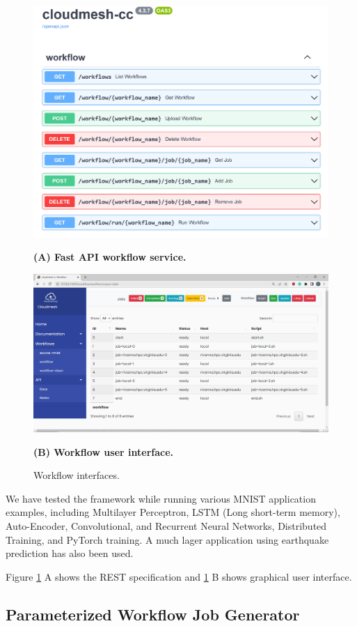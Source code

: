 \documentclass[utf8]{FrontiersinVancouver} %
\begin{document}
{\begin{figure}[htb]
  \centering\includegraphics[width=0.8\columnwidth]{images/fastapi-service-highres.png}
  
  {\bf (A) Fast API workflow service.}

  \bigskip


    \centering\includegraphics[width=0.8\columnwidth]{images/cc-1.png}

    {\bf (B) Workflow user interface.}

    \caption{Workflow interfaces.}
    \label{fig:cc-3}
\end{figure}


We have tested the framework while running various MNIST application
examples, including Multilayer Perceptron, LSTM (Long short-term
memory), Auto-Encoder, Convolutional, and Recurrent Neural Networks,
Distributed Training, and PyTorch training.  A much lager application
using earthquake prediction has also been used.

Figure \ref{fig:cc-3} A shows the REST specification and
\ref{fig:cc-3} B shows graphical user interface.

\subsection{Parameterized Workflow Job Generator}
\label{sec:workflow-sbatch}

}
\end{document}
